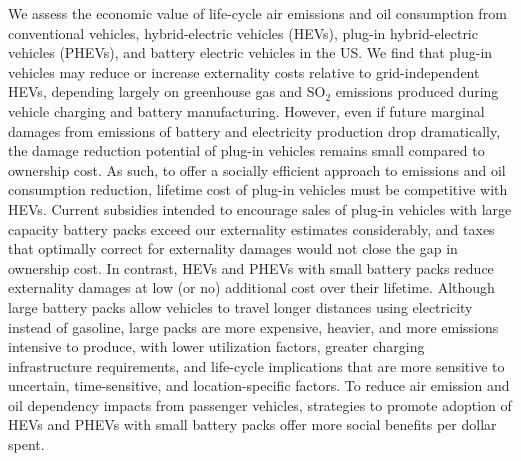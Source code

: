 We assess the economic value of life-cycle air emissions and oil consumption from conventional vehicles, hybrid-electric vehicles (HEVs), plug-in hybrid-electric vehicles (PHEVs), and battery electric vehicles in the US. We find that plug-in vehicles may reduce or increase externality costs relative to grid-independent HEVs, depending largely on greenhouse gas and SO$_2$ emissions produced during vehicle charging and battery manufacturing. However, even if future marginal damages from emissions of battery and electricity production drop dramatically, the damage reduction potential of plug-in vehicles remains small compared to ownership cost. As such, to offer a socially efficient approach to emissions and oil consumption reduction, lifetime cost of plug-in vehicles must be competitive with HEVs. Current subsidies intended to encourage sales of plug-in vehicles with large capacity battery packs exceed our externality estimates considerably, and taxes that optimally correct for externality damages would not close the gap in ownership cost. In contrast, HEVs and PHEVs with small battery packs reduce externality damages at low (or no) additional cost over their lifetime. Although large battery packs allow vehicles to travel longer distances using electricity instead of gasoline, large packs are more expensive, heavier, and more emissions intensive to produce, with lower utilization factors, greater charging infrastructure requirements, and life-cycle implications that are more sensitive to uncertain, time-sensitive, and location-specific factors. To reduce air emission and oil dependency impacts from passenger vehicles, strategies to promote adoption of HEVs and PHEVs with small battery packs offer more social benefits per dollar spent.
